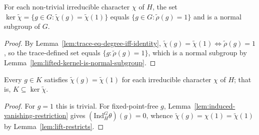 \begin{lemma}
    \label{lem:kernel-normal}
    \leanok
    For each non-trivial irreducible character $\chi$ of $H$, the set
    $\ker \widetilde{\chi} = \{ g \in G : \widetilde{\chi}(g) =
    \widetilde{\chi}(1)\}$ equals $\{g \in G : \widetilde\rho(g) = 1\}$ and is a
    normal subgroup of $G$.
\end{lemma}
\begin{proof}
    By Lemma~\ref{lem:trace-eq-degree-iff-identity}, $\widetilde\chi(g) =
    \widetilde\chi(1) \iff \widetilde\rho(g) = 1$, so the trace-defined set equals
    $\{g : \widetilde\rho(g) = 1\}$, which is a normal subgroup by
    Lemma~\ref{lem:lifted-kernel-is-normal-subgroup}.
\end{proof}

\begin{lemma}
    \label{lem:frobenius-kernel-in-each}
    \leanok
    Every $g \in K$ satisfies $\widetilde{\chi}(g) = \widetilde{\chi}(1)$ for each
    irreducible character $\chi$ of $H$; that is, $K \subseteq \ker
    \widetilde{\chi}$.
\end{lemma}
\begin{proof}
    For $g = 1$ this is trivial. For fixed-point-free $g$,
    Lemma~\ref{lem:induced-vanishing-restriction} gives
    $(\mathrm{Ind}_H^G\theta)(g) = 0$, whence $\widetilde{\chi}(g) = \chi(1) =
    \widetilde{\chi}(1)$ by Lemma~\ref{lem:lift-restricts}.
\end{proof}

